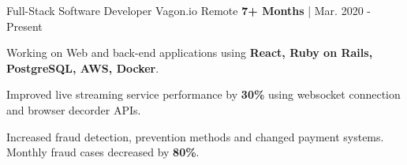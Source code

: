 
\begin{cventries}
  \cventry
   {Full-Stack Software Developer
   } %
    {Vagon.io} %
    {Remote} %
    {\textbf{7+ Months} | Mar. 2020 - Present} %
    {
      \begin{cvitems} %
        \item {Working on Web and back-end applications using \textbf{ React, Ruby on Rails, PostgreSQL, AWS, Docker}.}
		\item {Improved live streaming service performance by \textbf{30\%} using websocket connection and browser decorder APIs.}
		\item {Increased fraud detection, prevention methods and changed payment systems. Monthly fraud cases decreased by \textbf{80\%}.}
      \end{cvitems}
    }



\end{cventries}
